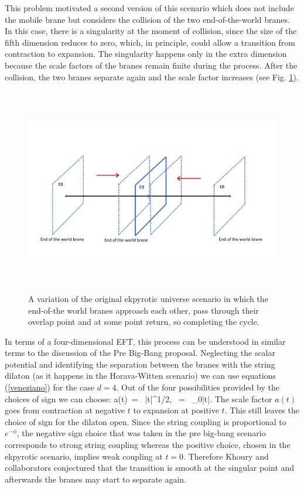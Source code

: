 This problem motivated a second version of this scenario 
 which does not include the mobile brane but considers the collision of the two end-of-the-world branes. In this case, there is 
a singularity at the moment of collision, since the size of the fifth dimension reduces to zero, 
 which, in principle, could allow a transition from 
contraction to expansion. The singularity happens only in the extra dimension because the scale 
factors of the branes remain finite during the process. After the collision, the two branes separate again and the scale factor increases (see Fig. \ref{F:ekpyvar}).
\begin{figure}[t]
\begin{center}
\vskip -10pt
\includegraphics[width=140mm,height=90mm]{Sections/Figures/Cyclic.pdf} 
\caption{A variation of the original ekpyrotic universe scenario in which the end-of-the world branes approach each other, pass through their overlap point and at some point return, so completing the cycle.} \label{F:ekpyvar}
\end{center}
\end{figure}

In terms of a four-dimensional EFT,  this process can be understood in similar terms to the discussion of the
 Pre Big-Bang proposal. Neglecting the scalar potential and identifying  the separation between the branes with 
 the string dilaton (as it happens in the Horava-Witten scenario) we can use equations (\ref{veneziano})
for the case $d=4$. Out of the four possibilities provided by the choices of sign we can choose:
\be
a(t)\ = \ |t|^{1/2}, \qquad \phi\ = \ \phi_0\pm {}\log|t|.
\ee
The  scale factor $a(t)$ goes from contraction
at negative $t$  to expansion at positive $t$. This still leaves the choice of sign for the 
dilaton open. Since the string coupling is proportional to 
$e^{-\phi}$, the negative sign  choice that was taken in the pre big-bang scenario
corresponds to strong string coupling whereas the positive choice, 
chosen in the ekpyrotic scenario, implies weak coupling at $t=0$. Therefore 
Khoury and collaborators conjectured that the transition is smooth at the singular point and  afterwards the branes may start to separate again. 



